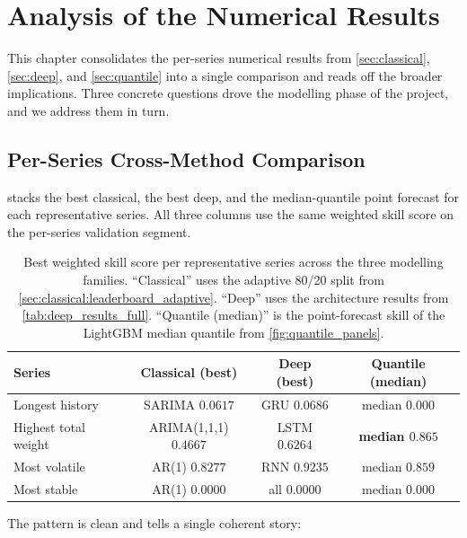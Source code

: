 \section{Analysis of the Numerical Results}
\label{sec:analysis}

This chapter consolidates the per-series numerical results from \cref{sec:classical}, \cref{sec:deep}, and \cref{sec:quantile} into a single comparison and reads off the broader implications. Three concrete questions drove the modelling phase of the project, and we address them in turn.

\subsection{Per-Series Cross-Method Comparison}
\label{sec:analysis:cross_method}

 stacks the best classical, the best deep, and the median-quantile point forecast for each representative series. All three columns use the same weighted skill score on the per-series validation segment.

\begin{table}[h]
\centering
\caption{Best weighted skill score per representative series across the three modelling families. ``Classical'' uses the adaptive 80/20 split from \cref{sec:classical:leaderboard_adaptive}. ``Deep'' uses the architecture results from \cref{tab:deep_results_full}. ``Quantile (median)'' is the point-forecast skill of the LightGBM median quantile from \cref{fig:quantile_panels}.}
\label{tab:cross_method}
\begin{tabular}{l c c c}
\toprule
Series & Classical (best) & Deep (best) & Quantile (median) \\
\midrule
Longest history       & SARIMA $0.0617$        & GRU $0.0686$        & median $0.000$ \\
Highest total weight  & ARIMA(1,1,1) $0.4667$  & LSTM $0.6264$       & \textbf{median $0.865$} \\
Most volatile         & AR(1) $0.8277$         & RNN $0.9235$        & median $0.859$ \\
Most stable           & AR(1) $0.0000$         & all $0.0000$        & median $0.000$ \\
\bottomrule
\end{tabular}
\end{table}

The pattern is clean and tells a single coherent story:

